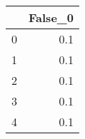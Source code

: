\begin{tabular}{lr}
\toprule
{} &  False\_0 \\ \hline
\midrule
0 &      0.1 \\ \hline
1 &      0.1 \\ \hline
2 &      0.1 \\ \hline
3 &      0.1 \\ \hline
4 &      0.1 \\ \hline
\bottomrule
\end{tabular}
